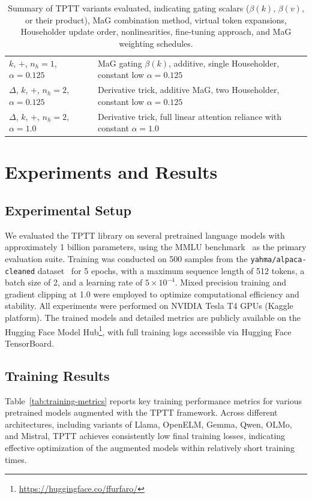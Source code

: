 \documentclass[10pt,a4paper]{article}
\begin{document}
\begin{table}[ht]
\begin{tabular}{|l|p{11cm}|}
$k$, $+$, $n_h=1$, $\alpha=0.125$ & MaG gating \(\beta(k)\), additive, single Householder, constant low \(\alpha=0.125\) \\
$\Delta$, $k$, $+$, $n_h=2$, $\alpha=0.125$ & Derivative trick, additive MaG, two Householder, constant low \(\alpha=0.125\) \\
$\Delta$, $k$, $+$, $n_h=2$, $\alpha=1.0$ & Derivative trick, full linear attention reliance with constant \(\alpha=1.0\) \\
\hline
\end{tabular}
\caption{Summary of TPTT variants evaluated, indicating gating scalars (\(\beta(k)\), \(\beta(v)\), or their product), MaG combination method, virtual token expansions, Householder update order, nonlinearities, fine-tuning approach, and MaG weighting schedules.}
\label{tab:variant_parameters}
\end{table}

\section{Experiments and Results}

\subsection{Experimental Setup}

We evaluated the TPTT library on several pretrained language models with approximately 1 billion parameters, using the MMLU benchmark~\cite{hendrycks2020measuring} as the primary evaluation suite. Training was conducted on 500 samples from the \texttt{yahma/alpaca-cleaned} dataset~\cite{taori2023alpaca} for 5 epochs, with a maximum sequence length of 512 tokens, a batch size of 2, and a learning rate of $5 \times 10^{-4}$. Mixed precision training and gradient clipping at 1.0 were employed to optimize computational efficiency and stability. All experiments were performed on NVIDIA Tesla T4 GPUs (Kaggle platform). The trained models and detailed metrics are publicly available on the Hugging Face Model Hub\footnote{\url{https://huggingface.co/ffurfaro/}}, with full training logs accessible via Hugging Face TensorBoard.


\subsection{Training Results}

Table~\ref{tab:training-metrics} reports key training performance metrics for various pretrained models augmented with the TPTT framework. Across different architectures, including variants of Llama, OpenELM, Gemma, Qwen, OLMo, and Mistral, TPTT achieves consistently low final training losses, indicating effective optimization of the augmented models within relatively short training times.
\end{document}
